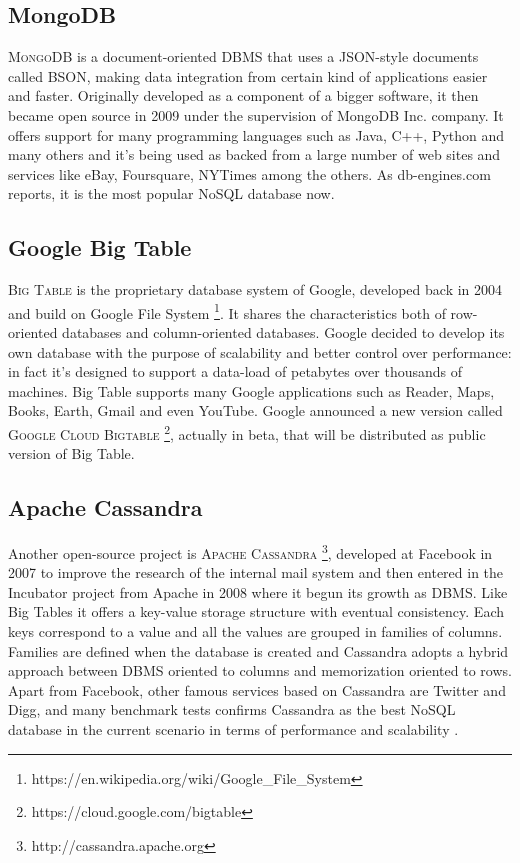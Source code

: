 \subsection{MongoDB}
\textsc{MongoDB} is a document-oriented DBMS that uses a JSON-style documents called BSON, making data integration from certain kind of applications easier and faster.
Originally developed as a component of a bigger software, it then became open source in 2009 under the supervision of MongoDB Inc. company.
It offers support for many programming languages such as Java, C++, Python and many others and it’s being used as backed from a large number of web sites and services like eBay, Foursquare, NYTimes among the others.
As db-engines.com reports, it is the most popular NoSQL database now.


\subsection{Google Big Table}
\textsc{Big Table} is the proprietary database system of Google, developed back in 2004 and build on Google File System \footnote{https://en.wikipedia.org/wiki/Google\_File\_System}. It shares the characteristics both of row-oriented databases and column-oriented databases. Google decided to develop its own database with the purpose of scalability and better control over performance: in fact it’s designed to support a data-load of petabytes over thousands of machines.
Big Table supports many Google applications such as Reader, Maps, Books, Earth, Gmail and even YouTube.
Google announced a new version called \textsc{Google Cloud Bigtable }\footnote{https://cloud.google.com/bigtable}, actually in beta, that will be distributed as public version of Big Table.

\subsection{Apache Cassandra}
Another open-source project is \textsc{Apache Cassandra} \footnote{http://cassandra.apache.org}, developed at Facebook in 2007 to improve the research of the internal mail system and then entered in the Incubator project from Apache in 2008 where it begun its growth as DBMS.
Like Big Tables it offers a key-value storage structure with eventual consistency. Each keys correspond to a value and all the values are grouped in families of columns. Families are defined when the database is created and Cassandra adopts a hybrid approach between DBMS oriented to columns and memorization oriented to rows.
Apart from Facebook, other famous services based on Cassandra are Twitter and Digg, and many benchmark tests confirms Cassandra as the best NoSQL database in the current scenario in terms of performance and scalability .

